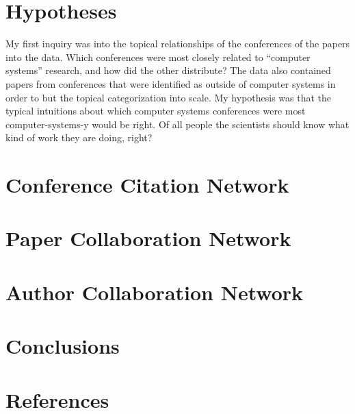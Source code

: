 \documentclass{article}
\begin{document}
\section{Hypotheses}

My first inquiry was into the topical relationships of the conferences of the papers into the data.
Which conferences were most closely related to ``computer systems'' research, and how did the other distribute?
The data also contained papers from conferences that were identified as outside of computer systems in order to but the topical categorization into scale.
My hypothesis was that the typical intuitions about which computer systems conferences were most computer-systems-y would be right.
Of all people the scientists should know what kind of work they are doing, right?


\section{Conference Citation Network}

\section{Paper Collaboration Network}

\section{Author Collaboration Network}


\section{Conclusions}


\section{References}
\end{document}

